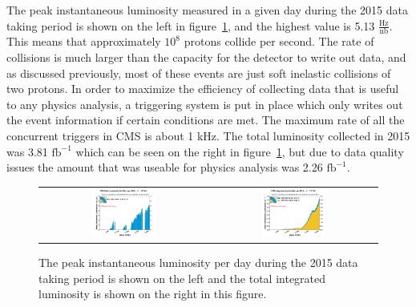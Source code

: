 The peak instantaneous luminosity measured in a given day during the 2015 data taking period is shown on the left in figure~\ref{fig:peaklumi},
and the highest value is 5.13 $\mathrm{\frac{Hz}{nb}}$.
This means that approximately $\mathrm{10^{8}}$ protons collide per second.
The rate of collisions is much larger than the capacity for the detector to write out data,
and as discussed previously, most of these events are just soft inelastic collisions of two protons.
In order to maximize the efficiency of collecting data that is useful to any physics analysis,
a triggering system is put in place which only writes out the event information if certain conditions are met.
The maximum rate of all the concurrent triggers in CMS is about 1 kHz.
The total luminosity collected in 2015 was 3.81 $\mathrm{fb^{-1}}$ which can be seen on the right in figure~\ref{fig:peaklumi},
but due to data quality issues the amount that was useable for physics analysis was 2.26 $\mathrm{fb^{-1}}$.

\begin{figure}[!ht]
  \begin{center}
    \begin{tabular}{c c}
      \includegraphics[width=0.4\textwidth]{cms/figs/peak_lumi_per_day_pp_2015.pdf} &
      \includegraphics[width=0.4\textwidth]{cms/figs/int_lumi_per_day_cumulative_pp_2015.pdf} \\      
    \end{tabular}
    \caption{
      The peak instantaneous luminosity per day during the 2015 data taking period is shown on the left
      and the total integrated luminosity is shown on the right in this figure.
      \label{fig:peaklumi}
    }
  \end{center}
\end{figure}

